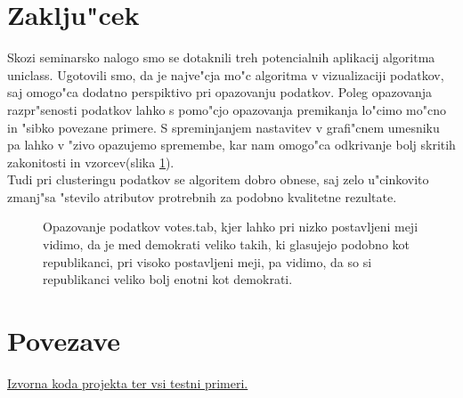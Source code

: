 \documentclass[a4paper]{article}
\begin{document}
\section{Zaklju"cek}
	Skozi seminarsko nalogo smo se dotaknili treh potencialnih aplikacij algoritma uniclass. Ugotovili smo, da je najve"cja mo"c algoritma v vizualizaciji podatkov, saj omogo"ca dodatno perspiktivo pri opazovanju podatkov. Poleg opazovanja razpr"senosti podatkov lahko s pomo"cjo opazovanja premikanja lo"cimo mo"cno in "sibko povezane primere. S spreminjanjem nastavitev v grafi"cnem umesniku pa lahko v "zivo opazujemo spremembe, kar nam omogo"ca odkrivanje bolj skritih zakonitosti in vzorcev(slika \ref{f-votes}). \\
	Tudi pri clusteringu podatkov se algoritem dobro obnese, saj zelo u"cinkovito zmanj"sa "stevilo atributov protrebnih za podobno kvalitetne rezultate. 

	\begin{figure}[H]
	\begin{center}
	\end{center}
	\caption{Opazovanje podatkov votes.tab, kjer lahko pri nizko postavljeni meji vidimo, da je med demokrati veliko takih, ki glasujejo podobno kot republikanci, pri visoko postavljeni meji, pa vidimo, da so si republikanci veliko bolj enotni kot demokrati.}
	\label{f-votes}
	\end{figure}

\section{Povezave}
	\href{https://github.com/hamaxx/Universe-Classification}{Izvorna koda projekta ter vsi testni primeri.}
\end{document}
